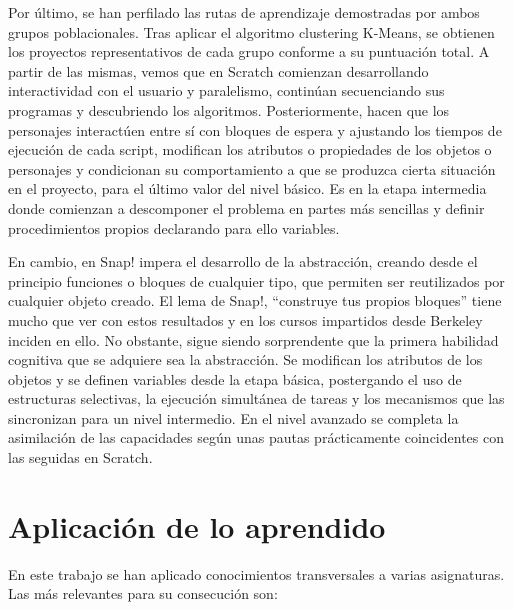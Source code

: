 \documentclass[a4paper, 12pt]{book}
\begin{document}
Por último, se han perfilado las rutas de aprendizaje demostradas por ambos grupos poblacionales. Tras aplicar el algoritmo clustering K-Means, se obtienen los proyectos representativos de cada grupo conforme a su puntuación total. A partir de las mismas, vemos que en Scratch comienzan desarrollando interactividad con el usuario y paralelismo, continúan secuenciando sus programas y descubriendo los algoritmos. Posteriormente, hacen que los personajes interactúen entre sí con bloques de espera y ajustando los tiempos de ejecución de cada script, modifican los atributos o propiedades de los objetos o personajes y condicionan su comportamiento a que se produzca cierta situación en el proyecto, para el último valor del nivel básico. Es en la etapa intermedia donde comienzan a descomponer el problema en partes más sencillas y definir procedimientos propios declarando para ello variables.

En cambio, en Snap! impera el desarrollo de la abstracción, creando desde el principio funciones o bloques de cualquier tipo, que permiten ser reutilizados por cualquier objeto creado. El lema de Snap!, ``construye tus propios bloques'' tiene mucho que ver con estos resultados y en los cursos impartidos desde Berkeley inciden en ello. No obstante, sigue siendo sorprendente que la primera habilidad cognitiva que se adquiere sea la abstracción. Se modifican los atributos de los objetos y se definen variables desde la etapa básica, postergando el uso de estructuras selectivas, la ejecución simultánea de tareas y los mecanismos que las sincronizan para un nivel intermedio. En el nivel avanzado se completa la asimilación de las capacidades según unas pautas prácticamente coincidentes con las seguidas en Scratch.


\section{Aplicación de lo aprendido}
\label{sec:aplicacion}

En este trabajo se han aplicado conocimientos transversales a varias asignaturas. Las más relevantes para su consecución son:
\end{document}
